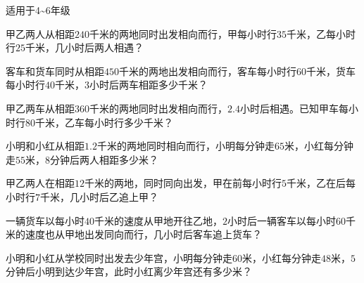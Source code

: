 \documentclass[a4paper,12pt]{ctexart}
\begin{document}
\pagestyle{empty}

\begin{center}
  \large 适用于4\~{}6年级
\end{center}
\vspace{0.3cm}



\begin{exercise}
\item 甲乙两人从相距$240$千米的两地同时出发相向而行，甲每小时行$35$千米，乙每小时行$25$千米，几小时后两人相遇？

\item 客车和货车同时从相距$450$千米的两地出发相向而行，客车每小时行$60$千米，货车每小时行$40$千米，$3$小时后两车相距多少千米？

\item 甲乙两车从相距$360$千米的两地同时出发相向而行，$2.4$小时后相遇。已知甲车每小时行$80$千米，乙车每小时行多少千米？

\item 小明和小红从相距$1.2$千米的两地同时相向而行，小明每分钟走$65$米，小红每分钟走$55$米，$8$分钟后两人相距多少米？
\end{exercise}


\begin{exercise}
\item 甲乙两人在相距$12$千米的两地，同时同向出发，甲在前每小时行$5$千米，乙在后每小时行$7$千米，几小时后乙追上甲？

\item 一辆货车以每小时$40$千米的速度从甲地开往乙地，$2$小时后一辆客车以每小时$60$千米的速度也从甲地出发同向而行，几小时后客车追上货车？

\item 小明和小红从学校同时出发去少年宫，小明每分钟走$60$米，小红每分钟走$48$米，$5$分钟后小明到达少年宫，此时小红离少年宫还有多少米？
\end{exercise}

\end{document}
